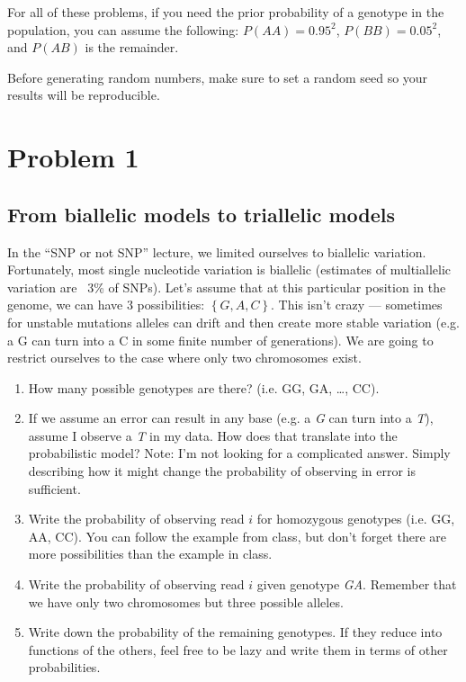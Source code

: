 \usepackage{hyperref}
\usepackage{enumitem}
\usepackage{float}



\lhead{}


For all of these problems, if you need the prior probability of a genotype in the population, you can assume the following: $P(AA) = 0.95^2$, $P(BB) = 0.05^2$, and $P(AB)$ is the remainder.

Before generating random numbers, make sure to set a random seed so your results will be reproducible.

\section*{Problem 1}
\subsection*{From biallelic models to triallelic models}

In the ``SNP or not SNP'' lecture, we limited ourselves to biallelic variation.
Fortunately, most single nucleotide variation is biallelic (estimates of multiallelic variation are ~3\% of SNPs).
Let's assume that at this particular position in the genome, we can have 3 possibilities: $\left\{G, A, C \right\}$.
This isn't crazy --- sometimes for unstable mutations alleles can drift and then create more stable variation (e.g. a G can turn into a C in some finite number of generations).
We are going to restrict ourselves to the case where only two chromosomes exist.

\begin{enumerate}[label=(\alph*)]

  \item How many possible genotypes are there? (i.e. GG, GA, \ldots, CC).
  \item If we assume an error can result in any base (e.g. a \textit{G} can turn into a \textit{T}), assume I observe a \textit{T} in my data. How does that translate into the probabilistic model? Note: I'm not looking for a complicated answer. Simply describing how it might change the probability of observing in error is sufficient.
   \item Write the probability of observing read $i$ for homozygous genotypes (i.e. GG, AA, CC). You can follow the example from class, but don't forget there are more possibilities than the example in class.
  \item Write the probability of observing read $i$ given genotype \textit{GA}. Remember that we have only two chromosomes but three possible alleles.
  \item Write down the probability of the remaining genotypes. If they reduce into functions of the others, feel free to be lazy and write them in terms of other probabilities.
\end{enumerate}


